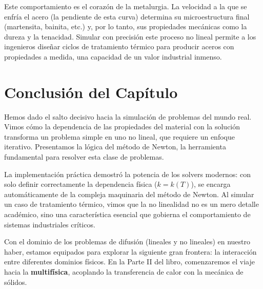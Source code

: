 Este comportamiento es el corazón de la metalurgia. La velocidad a la que se enfría el acero (la pendiente de esta curva) determina su microestructura final (martensita, bainita, etc.) y, por lo tanto, sus propiedades mecánicas como la dureza y la tenacidad. Simular con precisión este proceso no lineal permite a los ingenieros diseñar ciclos de tratamiento térmico para producir aceros con propiedades a medida, una capacidad de un valor industrial inmenso.

\section*{Conclusión del Capítulo}
Hemos dado el salto decisivo hacia la simulación de problemas del mundo real. Vimos cómo la dependencia de las propiedades del material con la solución transforma un problema simple en uno no lineal, que requiere un enfoque iterativo. Presentamos la lógica del método de Newton, la herramienta fundamental para resolver esta clase de problemas.

La implementación práctica demostró la potencia de los solvers modernos: con solo definir correctamente la dependencia física (\(k=k(T)\)), \fenics se encarga automáticamente de la compleja maquinaria del método de Newton. Al simular un caso de tratamiento térmico, vimos que la no linealidad no es un mero detalle académico, sino una característica esencial que gobierna el comportamiento de sistemas industriales críticos.

Con el dominio de los problemas de difusión (lineales y no lineales) en nuestro haber, estamos equipados para explorar la siguiente gran frontera: la interacción entre diferentes dominios físicos. En la Parte II del libro, comenzaremos el viaje hacia la \textbf{multifísica}, acoplando la transferencia de calor con la mecánica de sólidos.
